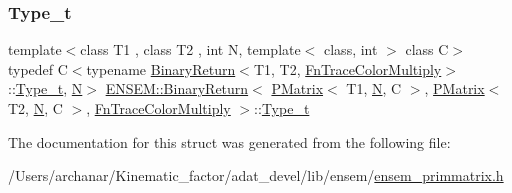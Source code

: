 \subsubsection{\texorpdfstring{Type\_t}{Type\_t}\hspace{0.1cm}{\footnotesize\ttfamily [2/2]}}
{\footnotesize\ttfamily template$<$class T1 , class T2 , int N, template$<$ class, int $>$ class C$>$ \\
typedef C$<$typename \mbox{\hyperlink{structENSEM_1_1BinaryReturn}{Binary\+Return}}$<$T1, T2, \mbox{\hyperlink{structENSEM_1_1FnTraceColorMultiply}{Fn\+Trace\+Color\+Multiply}}$>$\+::\mbox{\hyperlink{structENSEM_1_1BinaryReturn_3_01PMatrix_3_01T1_00_01N_00_01C_01_4_00_01PMatrix_3_01T2_00_01N_00_d90c323b0eef8bf9c5abb3303bff0c7e_a1a97d8e27c2d5f37e6e47f449e522310}{Type\+\_\+t}}, \mbox{\hyperlink{operator__name__util_8cc_a7722c8ecbb62d99aee7ce68b1752f337}{N}}$>$ \mbox{\hyperlink{structENSEM_1_1BinaryReturn}{E\+N\+S\+E\+M\+::\+Binary\+Return}}$<$ \mbox{\hyperlink{classENSEM_1_1PMatrix}{P\+Matrix}}$<$ T1, \mbox{\hyperlink{operator__name__util_8cc_a7722c8ecbb62d99aee7ce68b1752f337}{N}}, C $>$, \mbox{\hyperlink{classENSEM_1_1PMatrix}{P\+Matrix}}$<$ T2, \mbox{\hyperlink{operator__name__util_8cc_a7722c8ecbb62d99aee7ce68b1752f337}{N}}, C $>$, \mbox{\hyperlink{structENSEM_1_1FnTraceColorMultiply}{Fn\+Trace\+Color\+Multiply}} $>$\+::\mbox{\hyperlink{structENSEM_1_1BinaryReturn_3_01PMatrix_3_01T1_00_01N_00_01C_01_4_00_01PMatrix_3_01T2_00_01N_00_d90c323b0eef8bf9c5abb3303bff0c7e_a1a97d8e27c2d5f37e6e47f449e522310}{Type\+\_\+t}}}



The documentation for this struct was generated from the following file\+:\begin{DoxyCompactItemize}
\item 
/\+Users/archanar/\+Kinematic\+\_\+factor/adat\+\_\+devel/lib/ensem/\mbox{\hyperlink{lib_2ensem_2ensem__primmatrix_8h}{ensem\+\_\+primmatrix.\+h}}\end{DoxyCompactItemize}

